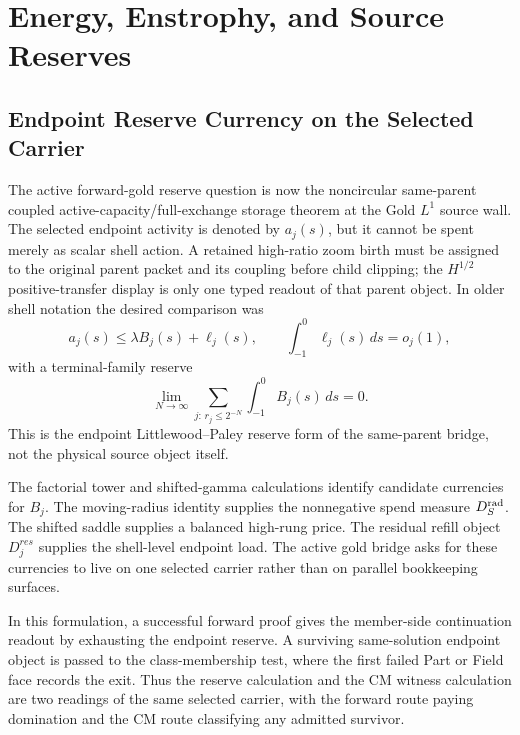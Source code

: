\section{Energy, Enstrophy, and Source Reserves}
\label{sec:energy-enstrophy-source-branch}

\subsection{Endpoint Reserve Currency on the Selected Carrier}
\label{subsec:endpoint-reserve-selected-carrier}

The active forward-gold reserve question is now the noncircular same-parent
coupled active-capacity/full-exchange storage theorem at the Gold \(L^1\)
source wall.  The selected endpoint activity is denoted by \(a_j(s)\), but it
cannot be spent merely as scalar shell action.  A retained high-ratio zoom birth
must be assigned to the original parent packet and its coupling before child
clipping; the \(H^{1/2}\) positive-transfer display is only one typed readout of
that parent object.
In older shell notation the desired comparison was
\[
  a_j(s)\le \lambda B_j(s)+\ell_j(s),
  \qquad
  \int_{-1}^{0}\ell_j(s)\,ds=o_j(1),
\]
with a terminal-family reserve
\[
  \lim_{N\to\infty}
  \sum_{j:\,r_j\le2^{-N}}
  \int_{-1}^{0}B_j(s)\,ds=0.
\]
This is the endpoint Littlewood--Paley reserve form of the same-parent bridge,
not the physical source object itself.

The factorial tower and shifted-gamma calculations identify candidate currencies for \(B_j\).  The moving-radius identity supplies the nonnegative spend measure \(D_S^{\rm rad}\).  The shifted saddle supplies a balanced high-rung price.  The residual refill object \(D_j^{res}\) supplies the shell-level endpoint load.  The active gold bridge asks for these currencies to live on one selected carrier rather than on parallel bookkeeping surfaces.

In this formulation, a successful forward proof gives the member-side continuation readout by exhausting the endpoint reserve.  A surviving same-solution endpoint object is passed to the class-membership test, where the first failed Part or Field face records the exit.  Thus the reserve calculation and the CM witness calculation are two readings of the same selected carrier, with the forward route paying domination and the CM route classifying any admitted survivor.

